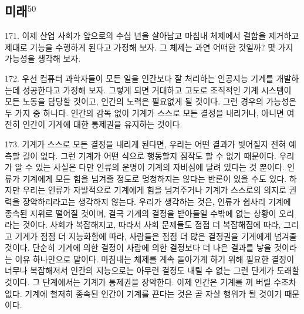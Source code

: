 \documentclass[11pt,a4paper]{article}
\begin{document}
\begin{multicols}{2}
\section*{미래\hyperlink{50}{$^{50}$}} 
171. 이제 산업 사회가 앞으로의 수십 년을 살아남고 마침내 체제에서 결함을 제거하고 제대로 기능을  수행하게 된다고 가정해 보자. 그 체제는 과연 어떠한 것일까? 몇 가지 가능성을 생각해 보자.  


172. 우선 컴퓨터 과학자들이 모든 일을 인간보다 잘 처리하는 인공지능 기계를 개발하는데 성공한다고  가정해 보자. 그렇게 되면 거대하고 고도로 조직적인 기계 시스템이 모든 노동을 담당할 것이고, 인간의  노력은 필요없게 될 것이다. 그런 경우의 가능성은 두 가지 중 하나다. 인간의 감독 없이 기계가 스스로  모든 결정을 내리거나, 아니면 여전히 인간이 기계에 대한 통제권을 유지하는 것이다.  


173. 기계가 스스로 모든 결정을 내리게 된다면, 우리는 어떤 결과가 빚어질지 전혀 예측할 길이 없다.  그런 기계가 어떤 식으로 행동할지 짐작도 할 수 없기 때문이다. 우리가 알 수 있는 사실은 다만 인류의  운명이 기계의 자비심에 달려 있다는 것 뿐이다. 인류가 기계에게 모든 힘을 넘겨줄 정도로 멍청하지는  않다는 반론이 있을 수도 있다. 하지만 우리는 인류가 자발적으로 기계에게 힘을 넘겨주거나 기계가  
스스로의 의지로 권력을 장악하리라고는 생각하지 않는다. 우리가 생각하는 것은, 인류가 쉽사리 기계에  종속된 지위로 떨어질 것이며, 결국 기계의 결정을 받아들일 수밖에 없는 상황이 오리라는 것이다. 사회가 복잡해지고, 따라서 사회 문제들도 점점 더 복잡해짐에 따라, 그리고 기계가 점점 더 지능화함에 따라, 사람들은 점점 더 많은 결정권을 기계에게 넘겨줄 것이다. 단순히 기계에 의한 결정이 사람에 의한  결정보다 더 나은 결과를 낳을 것이라는 이유 하나만으로 말이다. 마침내는 체제를 계속 돌아가게 하기  위해 필요한 결정이 너무나 복잡해져서 인간의 지능으로는 아무런 결정도 내릴 수 없는 그런 단계가  도래할 것이다. 그 단계에서는 기계가 통제권을 장악한다. 이제 인간은 기계를 꺼 버릴 수조차 없다.  기계에 철저히 종속된 인간이 기계를 끈다는 것은 곧 자살 행위가 될 것이기 때문이다.  



\end{multicols}
\end{document}
